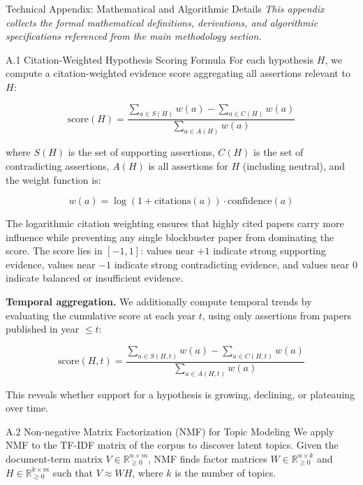 \documentclass[
  ignorenonframetext,
]{beamer}
\author{\texorpdfstring{}{}}
\date{}
\begin{document}
\begin{frame}{Technical Appendix: Mathematical and Algorithmic Details
\label{sec:technical_appendix}}
\protect{}\label{technical-appendix-mathematical-and-algorithmic-details}
\emph{This appendix collects the formal mathematical definitions,
derivations, and algorithmic specifications referenced from the main
methodology section.}

\begin{block}{A.1 Citation-Weighted Hypothesis Scoring Formula}
\protect{}\label{a.1-citation-weighted-hypothesis-scoring-formula}
For each hypothesis \(H\), we compute a citation-weighted evidence score
aggregating all assertions relevant to \(H\):

\[
\text{score}(H) = \frac{\sum_{a \in S(H)} w(a) - \sum_{a \in C(H)} w(a)}{\sum_{a \in A(H)} w(a)}
\]

where \(S(H)\) is the set of supporting assertions, \(C(H)\) is the set
of contradicting assertions, \(A(H)\) is all assertions for \(H\)
(including neutral), and the weight function is:

\[
w(a) = \log(1 + \text{citations}(a)) \cdot \text{confidence}(a)
\]

The logarithmic citation weighting ensures that highly cited papers
carry more influence while preventing any single blockbuster paper from
dominating the score. The score lies in \([-1, 1]\): values near \(+1\)
indicate strong supporting evidence, values near \(-1\) indicate strong
contradicting evidence, and values near \(0\) indicate balanced or
insufficient evidence.

\textbf{Temporal aggregation.} We additionally compute temporal trends
by evaluating the cumulative score at each year \(t\), using only
assertions from papers published in year \(\leq t\):

\[
\text{score}(H, t) = \frac{\sum_{a \in S(H,t)} w(a) - \sum_{a \in C(H,t)} w(a)}{\sum_{a \in A(H,t)} w(a)}
\]

This reveals whether support for a hypothesis is growing, declining, or
plateauing over time.
\end{block}

\begin{block}{A.2 Non-negative Matrix Factorization (NMF) for Topic
Modeling}
\protect{}\label{a.2-non-negative-matrix-factorization-nmf-for-topic-modeling}
We apply NMF to the TF-IDF matrix of the corpus to discover latent
topics. Given the document-term matrix
\(V \in \mathbb{R}^{n \times m}_{\geq 0}\), NMF finds factor matrices
\(W \in \mathbb{R}^{n \times k}_{\geq 0}\) and
\(H \in \mathbb{R}^{k \times m}_{\geq 0}\) such that \(V \approx WH\),
where \(k\) is the number of topics.


\end{block}
\end{frame}
\end{document}
